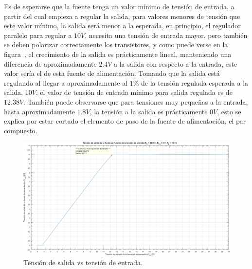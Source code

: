 Es de esperarse que la fuente tenga un valor mínimo de tensión de entrada, a partir del cual empieza a regular la salida, para valores menores de tensión que este valor mínimo, la salida será menor a la esperada, en principio, el regulador paralelo para regular a $10 V$, necesita una tensión de entrada mayor, pero también se deben polarizar correctamente los transistores, y como puede verse en la figura~, el crecimiento de la salida es prácticamente lineal, manteniendo una diferencia de aproximadamente $2.4V$ a la salida con respecto a la entrada, este valor sería el  de esta fuente de alimentación. Tomando que la salida está regulando al 
llegar a aproximadamente al $1 \%$ de la tensión regulada esperada a la salida, $10 V$, el valor de tensión de entrada mínimo para salida regulada es de $12.38 V$. También puede observarse que para tensiones muy pequeñas a la entrada, hasta aproximadamente $1.8 V$, la tensión a la salida es prácticamente $0 V$, esto se explica por estar cortado el elemento de paso de la fuente de alimentación, el par compuesto.

\vfill

\clearpage

\begin{figure}[H] %
\begin{center}
\includegraphics[width=1.2 \textwidth, angle=90]{./img/preguntas/p18.png}
\caption{\label{fig:fig_p18_vo_vs_vi}\footnotesize{Tensión de salida vs tensión de entrada.}}
\end{center}
\end{figure}

\clearpage